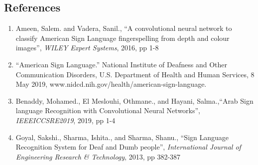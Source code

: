 \documentclass[11pt]{article}
\begin{document}
\begin{multicols}{2}
\subsection*{References}
\begin{enumerate}
\item[\textbf{[1]}] Ameen, Salem. and Vadera,  Sanil., \enquote{A convolutional neural network to classify American Sign Language fingerspelling from depth and colour images}, \textit{WILEY Expert Systems}, 2016, pp 1-8
\item[\textbf{[2]}] \enquote{American Sign Language.} National Institute of Deafness and Other Communication Disorders, U.S. Department of Health and Human Services, 8 May 2019, www.nidcd.nih.gov/health/american-sign-language.
\item[\textbf{[3]}] Benaddy, Mohamed., El Meslouhi, Othmane., and Hayani, Salma.,\enquote{Arab Sign language Recognition with Convolutional Neural Networks}, \textit{IEEEICCSRE2019}, 2019, pp 1-4
\item[\textbf{[4]}] Goyal, Sakshi., Sharma, Ishita., and Sharma, Shanu., \enquote{Sign Language Recognition System for Deaf and Dumb people}, \textit{International Journal of Engineering Research \& Technology}, 2013, pp 382-387


\end{enumerate}


\end{multicols}
\end{document}
